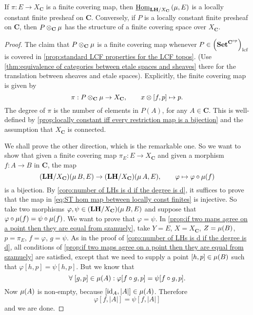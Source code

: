 \begin{theorem}
\label{thm:equivalence of categories}
If $\pi : E \to X_{\mathbf{C}}$ is a finite covering map, then $\underline{\operatorname{Hom}}_{\mathbf{LH}/X_{\mathbf{C}}}\left(\operatorname{\mu}, E \right)$ is a locally constant finite presheaf on $\mathbf{C}$. Conversely, if $P$ is a locally constant finite presheaf on $\mathbf{C}$, then $P \otimes_{\mathbf{C}} \operatorname{\mu}$ has the structure of a finite covering space over $X_{\mathbf{C}}$.
\end{theorem}
\begin{proof}
The claim that $P \otimes_{\mathbf{C}} \operatorname{\mu}$ is a finite covering map whenever $P \in \left(\mathbf{Set}^{\mathbf{C}^{op}}\right)_{\operatorname{lcf}}$ is covered in \cref{prop:standard LCF properties for the LCF topos}. (Use \cref{thm:equivalence of categories between etale spaces and sheaves} there for the translation between sheaves and etale spaces). Explicitly, the finite covering map is given by
\[ \pi : P \otimes_{\mathbf{C}} \operatorname{\mu} \to X_{\mathbf{C}}, \qquad x \otimes [f,p] \mapsto p. \]
The degree of $\pi$ is the number of elements in $P(A)$, for any $A \in \mathbf{C}$. This is well-defined by \cref{prop:locally constant iff every restriction map is a bijection} and the assumption that $X_{\mathbf{C}}$ is connected.

We shall prove the other direction, which is the remarkable one. So we want to show that given a finite covering map $\pi_E : E \to X_\mathbf{C}$ and given a morphism $f : A \to B$ in $\mathbf{C}$, the map
\begin{equation}
\label{eq:ST hom map between locally const finites}
(\mathbf{LH}/X_\mathbf{C})(\operatorname{\mu} B, E) \to (\mathbf{LH}/X_\mathbf{C})(\operatorname{\mu} A, E), \qquad \varphi \mapsto \varphi \circ \operatorname{\mu}(f)
\end{equation}
is a bijection. By \cref{coro:number of LHs is d if the degree is d}, it suffices to prove that the map in \cref{eq:ST hom map between locally const finites} is injective. So take two morphisms $\varphi, \psi \in (\mathbf{LH}/X_\mathbf{C})(\operatorname{\mu} B, E)$ and suppose that $ \varphi \circ \operatorname{\mu}(f) = \psi \circ \operatorname{\mu}(f)$. We want to prove that $\varphi = \psi$. In \cref{prop:if two maps agree on a point then they are equal from szamuely}, take $Y = E$, $X = X_{\mathbf{C}}$, $Z = \operatorname{\mu}(B)$, $p = \pi_E$, $f = \varphi$, $g = \psi$. As in the proof of \cref{coro:number of LHs is d if the degree is d}, all conditions of \cref{prop:if two maps agree on a point then they are equal from szamuely} are satisfied, except that we need to supply a point $[h,p] \in \operatorname{\mu}(B)$ such that $\varphi[h,p] = \psi[h,p]$. But we know that
\[ \forall \; [g,p] \in \operatorname{\mu}(A) : \varphi[f \circ g,p] = \psi[f \circ g, p]. \]
Now $\operatorname{\mu}(A)$ is non-empty, because $[\operatorname{id}_A, |A|] \in \operatorname{\mu}(A)$. Therefore
\[ \varphi[f, |A|] = \psi[f, |A|] \]
and we are done.
\end{proof}


